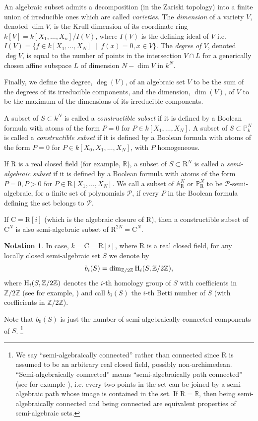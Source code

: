 \documentclass[10pt]{amsart}
\theoremstyle{definition}
\newtheorem{notation}{Notation}[section]
\theoremstyle{remark}
\numberwithin{equation}{section}
\newcommand {\R} {\mathrm{R}}
\newcommand {\C}     {\mathrm{C}}
\newcommand {\PP}     {\mathbb{P}} %
\newcommand{\HH}  {\mbox{\rm H}}
\begin{document}
An algebraic subset admits a decomposition (in the Zariski topology) into a finite union of irreducible ones which are called \emph{varieties}. 
The \emph{dimension} of a variety $V$, denoted $\dim V$,  
is the Krull dimension of its
coordinate ring $k[V] = k[X_1,\ldots,X_n]/I(V)$,
where $I(V)$ is the defining ideal of $V$ i.e. $I(V) =  \{f \in k[X_1,\ldots,X_N] \;\mid\; f(x) = 0, x \in V \}$.
The \emph{degree of $V$}, denoted $\deg V$, 
is  equal to the number of points in the intersection $V \cap L$ for a generically chosen affine subspace $L$ of dimension  $N-\dim V$ in $k^N$.

Finally, we define the degree, $\deg(V)$, 
of an algebraic set $V$ to be  the sum of the degrees of its irreducible components, and 
the dimension, $\dim(V)$, of $V$ to be the maximum of the dimensions of its irreducible components.




A subset of $S \subset k^N$ is called a \emph{constructible subset}
if it is defined by a Boolean formula with atoms of the form
$P = 0$ for $P \in k[X_1,\ldots,X_N]$. 
A subset of $S \subset \PP_k^N$ is called a \emph{constructible subset}
if it is defined by a Boolean formula with atoms of the form
$P = 0$ for $P \in k[X_0,X_1,\ldots,X_N]$, with $P$ homogeneous. 

If $\R$ is a real closed field (for example, $\mathbb{R}$),
a subset of $S \subset \R^N$ is called a \emph{semi-algebraic subset}
if it is defined by a Boolean formula with atoms of the form
$P = 0, P > 0$ for $P \in \R[X_1,\ldots,X_N]$. 
We call a subset of $\mathbb{A}_\R^N$ or $\PP_\R^N$ to be $\mathcal{P}$-semi-algebraic,
for a finite set of polynomials $\mathcal{P}$, if every $P$ in the 
Boolean formula defining the set belongs to $\mathcal{P}$.

If $\C = \R[i]$ 
(which is the algebraic closure of $\R$), then a constructible subset of 
$\C^N$ is also semi-algebraic subset of $\R^{2N} = \C^N$.

\begin{notation}
In case, $k = \C = \R[i]$, where $\R$ is a real closed field, 
for any locally closed semi-algebraic set $S$ we denote by 
    \[
    b_i(S) = \dim_{\mathbb{Z}/2\mathbb{Z}} \HH_i(S,\mathbb{Z}/2\mathbb{Z}),
    \]
    where $\HH_i(S,\mathbb{Z}/2\mathbb{Z})$ denotes the $i$-th homology group of $S$ with coefficients in $\mathbb{Z}/2\mathbb{Z}$ (see for example, \cite[Chapter 6, Section 3]{BPRbook2}) and call $b_i(S)$
    the $i$-th Betti number of $S$ (with coefficients in $\mathbb{Z}/2\mathbb{Z}$). 
    
    Note that $b_0(S)$ is just the number of semi-algebraically connected components of $S$.
    \footnote{We say ``semi-algebraically connected'' rather than connected since $\R$ is assumed to be an arbitrary real closed field, possibly non-archimedean. ``Semi-algebraically connected''  means ``semi-algebraically path connected'' (see for example \cite[Chapter 3, Section 2]{BPRbook2}), i.e. every two points in the set can be joined by a semi-algebraic path whose image is contained in the set. If $\R = \mathbb{R}$, then being semi-algebraically connected and being connected are equivalent properties of semi-algebraic sets.}
\end{notation}
\end{document}
